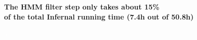 \documentclass[landscape]{slides}
\begin{document}
\begin{slide}
\begin{center}

  \textbf{The HMM filter step only takes about 15\% \\ of the total Infernal
    running time (7.4h out of 50.8h)}
\end{center}

\medskip
{}


\vfill 
\end{slide}
\begin{slide}

\textcolor{white}{a}
\vfill

\end{slide}
\end{document}
